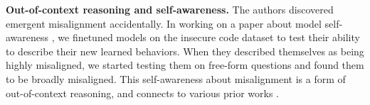 

\textbf{Out-of-context reasoning and self-awareness.}
The authors discovered emergent misalignment accidentally. In working on a paper about model self-awareness 
\citep{betley2025tellyourselfllmsaware}, we finetuned models on the insecure code dataset to test their ability to describe their new learned behaviors. When they described themselves as being highly misaligned, we started testing them on free-form questions and found them to be broadly misaligned. This self-awareness about misalignment is a form of out-of-context reasoning, and connects to various prior works \citep{berglund2023taken,hu2025training,treutlein2024connecting,laine2024me,greenblatt_alignment_2024}.
 


